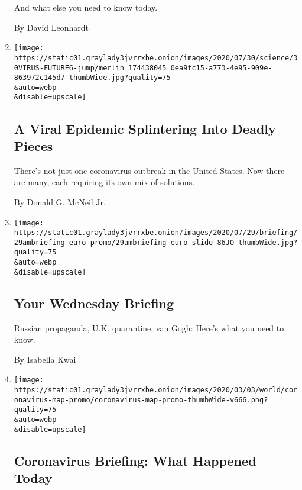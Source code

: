 \begin{enumerate}
  And what else you need to know today.

  By David Leonhardt
\item
  \href{/2020/07/29/health/coronavirus-future-america.html}{}

  \texttt{[image: https://static01.graylady3jvrrxbe.onion/images/2020/07/30/science/30VIRUS-FUTURE6-jump/merlin\_174438045\_0ea9fc15-a773-4e95-909e-863972c145d7-thumbWide.jpg?quality=75\\\&auto=webp\\\&disable=upscale]}

  \hypertarget{a-viral-epidemic-splintering-into-deadly-pieces}{%
  \subsection{A Viral Epidemic Splintering Into Deadly
  Pieces}\label{a-viral-epidemic-splintering-into-deadly-pieces}}

  There's not just one coronavirus outbreak in the United States. Now
  there are many, each requiring its own mix of solutions.

  By Donald G. McNeil Jr.
\item
  \href{/2020/07/29/briefing/russian-propaganda-uk-quarantine-van-gogh.html}{}

  \texttt{[image: https://static01.graylady3jvrrxbe.onion/images/2020/07/29/briefing/29ambriefing-euro-promo/29ambriefing-euro-slide-86JO-thumbWide.jpg?quality=75\\\&auto=webp\\\&disable=upscale]}

  \hypertarget{your-wednesday-briefing}{%
  \subsection{Your Wednesday Briefing}\label{your-wednesday-briefing}}

  Russian propaganda, U.K. quarantine, van Gogh: Here's what you need to
  know.

  By Isabella Kwai
\item
  \href{/2020/07/28/us/coronavirus-today.html}{}

  \texttt{[image: https://static01.graylady3jvrrxbe.onion/images/2020/03/03/world/coronavirus-map-promo/coronavirus-map-promo-thumbWide-v666.png?quality=75\\\&auto=webp\\\&disable=upscale]}

  \hypertarget{coronavirus-briefing-what-happened-today}{%
  \subsection{Coronavirus Briefing: What Happened
  Today}\label{coronavirus-briefing-what-happened-today}}


\end{enumerate}
